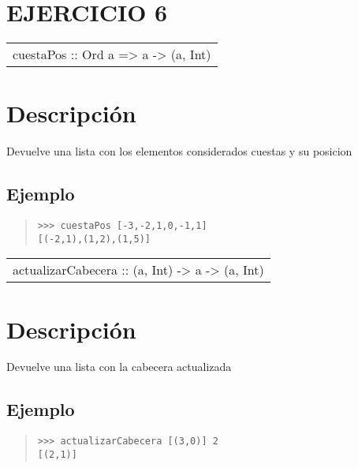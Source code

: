 \section{EJERCICIO 6}
\begin{haddockdesc}
\item[\begin{tabular}{@{}l}
cuestaPos :: Ord a => {\char 91}a{\char 93} -> {\char 91}(a, Int){\char 93}
\end{tabular}]
{\haddockbegindoc
\section*{Descripción}
Devuelve una lista con los elementos considerados cuestas y su posicion\par
\subsection*{Ejemplo}
\begin{quote}
{\haddockverb\begin{verbatim}
>>> cuestaPos [-3,-2,1,0,-1,1]
[(-2,1),(1,2),(1,5)]

\end{verbatim}}
\end{quote}}
\end{haddockdesc}
\begin{haddockdesc}
\item[\begin{tabular}{@{}l}
actualizarCabecera :: {\char 91}(a, Int){\char 93} -> a -> {\char 91}(a, Int){\char 93}
\end{tabular}]
{\haddockbegindoc
\section*{Descripción}
Devuelve una lista con la cabecera actualizada\par
\subsection*{Ejemplo}
\begin{quote}
{\haddockverb\begin{verbatim}
>>> actualizarCabecera [(3,0)] 2
[(2,1)]

\end{verbatim}}
\end{quote}}
\end{haddockdesc}
